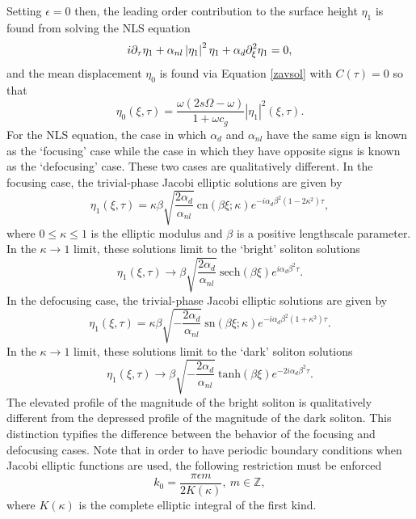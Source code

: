 \documentclass{JFM_Style/jfm}
\begin{document}
Setting $\epsilon=0$ then, the leading order contribution to the surface height $\eta_{1}$ is found from solving the NLS equation
\[
i\partial_{\tau}\eta_{1} + \alpha_{nl}\left|\eta_{1}\right|^{2}\eta_{1} + \alpha_{d}\partial_{\xi}^{2}\eta_{1} = 0,
\]
and the mean displacement $\eta_{0}$ is found via Equation \eqref{zavsol} with $C(\tau)=0$ so that
\begin{equation}
\eta_{0}(\xi,\tau) = \frac{\omega(2s\Omega-\omega)}{1+\omega c_{g}}\left|\eta_{1}\right|^{2}(\xi,\tau).
\label{meansurf}
\end{equation}
For the NLS equation, the case in which $\alpha_{d}$ and $\alpha_{nl}$ have the same sign is known as the `focusing' case while the case in which they have opposite signs is known as the `defocusing' case.  These two cases are qualitatively different.  In the focusing case, the trivial-phase Jacobi elliptic solutions are given by
\begin{equation}
\eta_{1}(\xi,\tau) = \kappa\beta \sqrt{\frac{2\alpha_{d}}{\alpha_{nl}}}~\mbox{cn}(\beta \xi;\kappa)e^{-i\alpha_{d}\beta^{2}(1-2\kappa^2)\tau},
\label{cnsolns}
\end{equation}
where $0\le\kappa\le1$ is the elliptic modulus and $\beta$ is a positive lengthscale parameter.  In the $\kappa \rightarrow 1$ limit, these solutions limit to the `bright' soliton solutions
\[
\eta_{1}(\xi,\tau) \rightarrow \beta \sqrt{\frac{2\alpha_{d}}{\alpha_{nl}}}~\mbox{sech}(\beta \xi)e^{i\alpha_{d}\beta^{2}\tau}.
\]
In the defocusing case, the trivial-phase Jacobi elliptic solutions are given by 
\begin{equation}
\eta_{1}(\xi,\tau) = \kappa\beta \sqrt{-\frac{2\alpha_{d}}{\alpha_{nl}}}~\mbox{sn}(\beta \xi;\kappa) e^{-i\alpha_{d}\beta^{2}(1+\kappa^2)\tau}.
\label{snsolns}
\end{equation}
In the $\kappa\rightarrow1$ limit, these solutions limit to the `dark'
soliton solutions
\[
\eta_{1}(\xi,\tau) \rightarrow \beta \sqrt{-\frac{2\alpha_{d}}{\alpha_{nl}}}~ \mbox{tanh}(\beta \xi)  e^{-2i\alpha_{d}\beta^{2}\tau}.
\] 
The elevated profile of the magnitude of the bright soliton is qualitatively different from the depressed profile of the magnitude of the dark soliton.  This distinction typifies the difference between the behavior of the focusing and defocusing cases.  Note that in order to have periodic boundary conditions when Jacobi elliptic functions are used, the following restriction must be enforced
\begin{equation}
k_{0} = \frac{\pi \epsilon m}{2K(\kappa)},~ m\in \mathbb{Z},
\label{jacwavnum}
\end{equation}
where $K(\kappa)$ is the complete elliptic integral of the first kind.   
\end{document}
